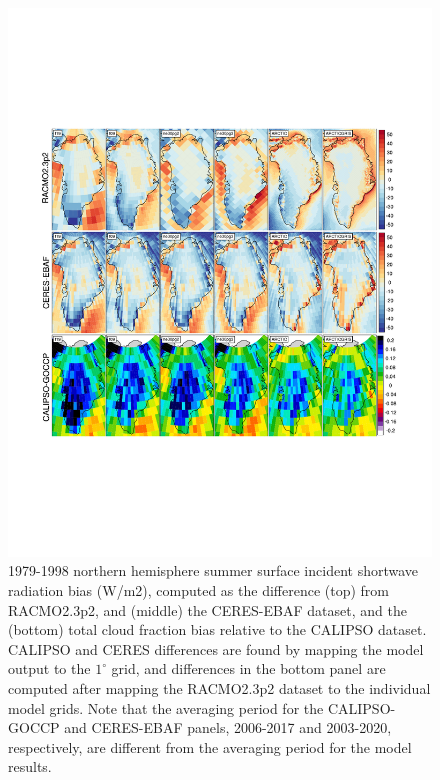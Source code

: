 \documentclass[draft]{agujournal2019}
\begin{document}
\begin{figure}[t]
\begin{center}
         \includegraphics[width=130mm]{temp_contours_diffCALIPSOdiffCERESdiffRACMO.pdf}
\end{center}
\caption{1979-1998 northern hemisphere summer surface incident shortwave radiation bias (W/m2), computed as the difference (top) from RACMO2.3p2, and (middle) the CERES-EBAF dataset, and the (bottom) total cloud fraction bias relative to the CALIPSO dataset. CALIPSO and CERES differences are found by mapping the model output to the $1^{\circ}$ grid, and differences in the bottom panel are computed after mapping the RACMO2.3p2 dataset to the individual model grids. Note that the averaging period for the CALIPSO-GOCCP and CERES-EBAF panels, 2006-2017 and 2003-2020, respectively, are different from the averaging period for the model results.}
\label{fig:FSDS}
\end{figure}
\end{document}
